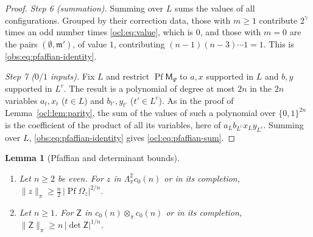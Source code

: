 \documentclass[11pt]{amsart}
\newtheorem{lemma}[theorem]{Lemma}
\theoremstyle{definition}
\theoremstyle{remark}
\numberwithin{equation}{section}
\newcommand{\abs}[1]{\lvert #1\rvert}
\newcommand{\norm}[1]{\lVert #1\rVert}
\theoremstyle{plain}
\theoremstyle{definition}
\theoremstyle{plain}
\begin{document}
\begin{proof}
\emph{Step 6 (summation).} Summing over $L$ sums the values of all configurations. Grouped by their correction data,
those with $m\ge1$ contribute $2^\gamma$ times an odd number times \eqref{ocl:eq:value}, which is $0$, and those with
$m=0$ are the pairs $(\emptyset,\mathfrak m')$, of value $1$, contributing $(n-1)(n-3)\cdots1=1$. This is
\eqref{obs:eq:pfaffian-identity}.

\emph{Step 7 ($0/1$ inputs).} Fix $L$ and restrict $\operatorname{Pf}\mathsf M_\Psi$ to $a,x$ supported in $L$ and $b,y$
supported in $L^c$. The result is a polynomial of degree at most $2n$ in the $2n$ variables $a_t,x_t$ ($t\in L$) and
$b_{t'},y_{t'}$ ($t'\in L^c$). As in the proof of Lemma~\ref{ocl:lem:parity}, the sum of the values of such a polynomial over
$\{0,1\}^{2n}$ is the coefficient of the product of all its variables, here of $a_Lb_{L^c}x_Ly_{L^c}$. Summing over $L$,
\eqref{obs:eq:pfaffian-identity} gives \eqref{ocl:eq:pfaffian-sum}.
\end{proof}

\begin{lemma}[Pfaffian and determinant bounds]\label{ocl:lem:pfaffian-bound}
\leavevmode
\begin{enumerate}
\item Let $n\ge2$ be even. For $z$ in $\Lambda^2_\pi c_0(n)$ or in its completion, $\norm z_\pi\ge\frac n2\,
\abs{\operatorname{Pf}\Omega_z}^{2/n}$.
\item Let $n\ge1$. For $\mathsf Z$ in $c_0(n)\otimes_\pi c_0(n)$ or in its completion, $\norm{\mathsf Z}_\pi\ge n\,
\abs{\det\mathsf Z}^{1/n}$.
\end{enumerate}
\end{lemma}
\end{document}
